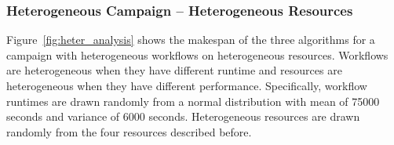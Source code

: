 \subsubsection*{Heterogeneous Campaign -- Heterogeneous Resources}


Figure~\ref{fig:heter_analysis} shows the makespan of the three algorithms for a campaign with heterogeneous workflows on heterogeneous resources.
Workflows are heterogeneous when they have different runtime and resources are heterogeneous when they have different performance.
Specifically, workflow runtimes are drawn randomly from a normal distribution with mean of 75000 seconds and variance of 6000 seconds.
Heterogeneous resources are drawn randomly from the four resources described before.

